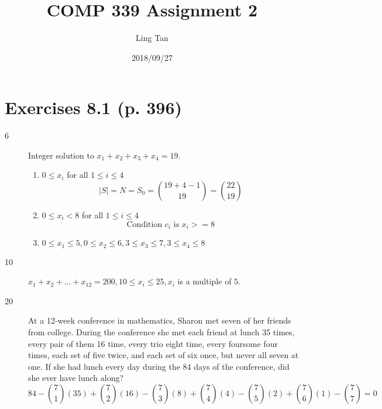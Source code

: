 \documentclass[a4paper]{article}
\title{COMP 339 Assignment 2}
\author{Ling Tan}
\date{2018/09/27}
\begin{document}
\maketitle

\section*{Exercises 8.1 (p. 396)}
\begin{description}
\item[6] Integer solution to $x_1+x_2+x_3+x_4=19$.
\begin{enumerate}[label=\alph*)]
    \item $0\leq x_i$ for all $1\leq i\leq 4$\\
    $$|S| = N =S_0=\binom{19+4-1}{19}=\binom{22}{19}$$
    \item $0\leq x_i < 8$ for all $1\leq i\leq 4$\\
    $$\text{Condition }c_i\text{ is }x_i>=8$$
    \item $0\leq x_1 \leq 5, 0\leq x_2 \leq 6, 3\leq x_3 \leq 7, 3\leq x_4 \leq 8$
\end{enumerate}
\item[10] $x_1+x_2+\dots+x_{12}=200,10\leq x_i\leq25,x_i$ is a multiple of $5$.
\item[20] At a 12-week conference in mathematics, Sharon met seven of her friends from college. During the conference she met each friend at lunch 35 times, every pair of them 16 time, every trio eight time, every foursome four times, each set of five twice, and each set of six once, but never all seven at one. If she had lunch every day during the 84 days of the conference, did she ever have lunch along?\\
\begin{equation*}
    84-\binom{7}{1}(35)+\binom{7}{2}(16)-\binom{7}{3}(8)+\binom{7}{4}(4)-\binom{7}{5}(2)+\binom{7}{6}(1)-\binom{7}{7}=0
\end{equation*}
\end{description}
\end{document}
